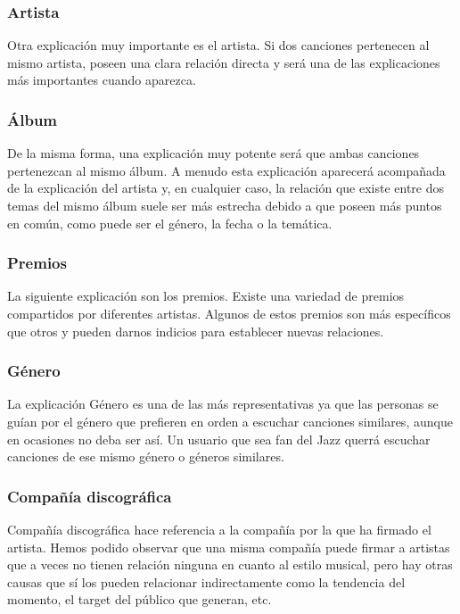 \subsubsection*{Artista}

Otra explicación muy importante es el artista. Si dos canciones pertenecen al mismo artista, poseen una clara relación directa y será una de las explicaciones más importantes cuando aparezca.

\subsubsection*{Álbum}

De la misma forma, una explicación muy potente será que ambas canciones pertenezcan al mismo álbum. A menudo esta explicación aparecerá acompañada de la explicación del artista y, en cualquier caso, la relación que existe entre dos temas del mismo álbum suele ser más estrecha debido a que poseen más puntos en común, como puede ser el género, la fecha o la temática.

\subsubsection*{Premios}

La siguiente explicación son los premios. Existe una variedad de premios compartidos por diferentes artistas. Algunos de estos premios son más específicos que otros y pueden darnos indicios para establecer nuevas relaciones.

\subsubsection*{Género}

La explicación Género es una de las más representativas ya que las personas se guían por el género que prefieren en orden a escuchar canciones similares, aunque en ocasiones no deba ser así. Un usuario que sea fan del Jazz querrá escuchar canciones de ese mismo género o géneros similares.

\subsubsection*{Compañía discográfica}

Compañía discográfica hace referencia a la compañía por la que ha firmado el artista. Hemos podido observar que una misma compañía puede firmar a artistas que a veces no tienen relación ninguna en cuanto al estilo musical, pero hay otras causas que sí los pueden relacionar indirectamente como la tendencia del momento, el target del público que generan, etc.


